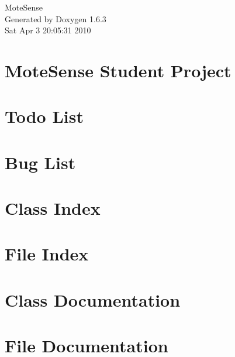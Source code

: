 \documentclass[a4paper]{book}
\begin{document}
\hypersetup{pageanchor=false}
\begin{titlepage}
\vspace*{7cm}
\begin{center}
{\Large MoteSense }\\
\vspace*{1cm}
{\large Generated by Doxygen 1.6.3}\\
\vspace*{0.5cm}
{\small Sat Apr 3 20:05:31 2010}\\
\end{center}
\end{titlepage}
\clearemptydoublepage
{}
\tableofcontents
\clearemptydoublepage
{}
\hypersetup{pageanchor=true}
\chapter{MoteSense Student Project}
\label{index}\hypertarget{index}{}
\chapter{Todo List}
\label{todo}
\hypertarget{todo}{}

\chapter{Bug List}
\label{bug}
\hypertarget{bug}{}

\chapter{Class Index}

\chapter{File Index}

\chapter{Class Documentation}





\chapter{File Documentation}











\printindex
\end{document}
